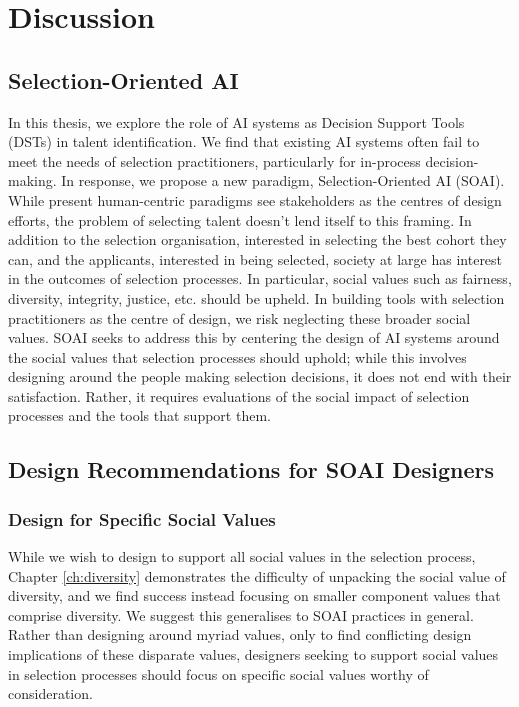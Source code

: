 

\chapter{\label{ch:discussion}Discussion}

\minitoc

\section{Selection-Oriented AI}
In this thesis, we explore the role of AI systems as Decision Support Tools (DSTs) in talent identification. We find that existing AI systems often fail to meet the needs of selection practitioners, particularly for in-process decision-making. In response, we propose a new paradigm, Selection-Oriented AI (SOAI). While present human-centric paradigms see stakeholders as the centres of design efforts, the problem of selecting talent doesn't lend itself to this framing. In addition to the selection organisation, interested in selecting the best cohort they can, and the applicants, interested in being selected, society at large has interest in the outcomes of selection processes. In particular, social values such as fairness, diversity, integrity, justice, etc. should be upheld. In building tools with selection practitioners as the centre of design, we risk neglecting these broader social values. SOAI seeks to address this by centering the design of AI systems around the social values that selection processes should uphold; while this involves designing around the people making selection decisions, it does not end with their satisfaction. Rather, it requires evaluations of the social impact of selection processes and the tools that support them.

\section{Design Recommendations for SOAI Designers}
\subsection{Design for Specific Social Values}
While we wish to design to support all social values in the selection process, Chapter \ref{ch:diversity} demonstrates the difficulty of unpacking the social value of diversity, and we find success instead focusing on smaller component values that comprise diversity. We suggest this generalises to SOAI practices in general. Rather than designing around myriad values, only to find conflicting design implications of these disparate values, designers seeking to support social values in selection processes should focus on specific social values worthy of consideration.

